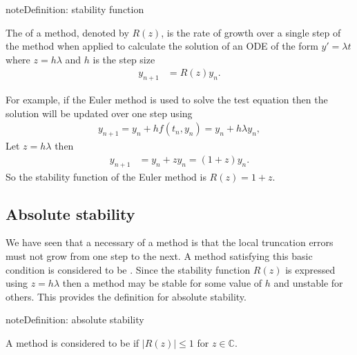 \documentclass[letterpaper,10pt,english]{jupyterBook}
\begin{document}
\begin{sphinxadmonition}{note}{Definition: stability function}

\sphinxAtStartPar
The  of a method, denoted by \(R(z)\), is the rate of growth over a single step of the method when applied to calculate the solution of an ODE of the form \(y'=\lambda t\) where \(z = h \lambda\) and \(h\) is the step size
\begin{align*}
    y_{n+1} &= R(z)y_n.
\end{align*}\end{sphinxadmonition}

\sphinxAtStartPar
For example, if the Euler method is used to solve the test equation then the solution will be updated over one step using
\begin{align*}
    y_{n+1} =y_n + h f(t_n ,y_n) = y_n + h \lambda y_n,
\end{align*}
\sphinxAtStartPar
Let \(z = h\lambda\) then
\begin{align*}
    y_{n+1} &= y_n + z y_n =(1+z)y_n.
\end{align*}
\sphinxAtStartPar
So the stability function of the Euler method is \(R(z) = 1 + z\).


\subsection{Absolute stability}
\label{\detokenize{4_Stability/4.1_Stability_functions:absolute-stability}}\label{\detokenize{4_Stability/4.1_Stability_functions:absolute-stability-section}}
\sphinxAtStartPar
We have seen that a necessary {\hyperref[\detokenize{4_Stability/4.0_Stability:stability-definition}]{}} of a method is that the local truncation errors must not grow from one step to the next. A method satisfying this basic condition is considered to be . Since the stability function \(R(z)\) is expressed using \(z=h\lambda\) then a method may be stable for some value of \(h\) and unstable for others. This provides the definition for absolute stability.

\begin{sphinxadmonition}{note}{Definition: absolute stability}

\sphinxAtStartPar
A method is considered to be  if \(|R(z)| \leq 1\) for \(z\in \mathbb{C}\).
\end{sphinxadmonition}
\end{document}
